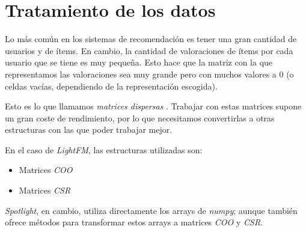 \section{Tratamiento de los datos}\label{tratamiento-datos}
Lo más común en los sistemas de recomendación es tener una gran cantidad de usuarios y de ítems. En cambio, la cantidad de valoraciones de ítems por cada usuario que se tiene es muy pequeña. Esto hace que la matriz con la que representamos las valoraciones sea muy grande pero con muchos valores a 0 (o celdas vacías, dependiendo de la representación escogida).  

Esto es lo que llamamos \textit{matrices dispersas} \cite{wiki:Sparse_matrix}. Trabajar con estas matrices supone un gran coste de rendimiento, por lo que necesitamos convertirlas a otras estructuras con las que poder trabajar mejor.

En el caso de \textit{LightFM}, las estructuras utilizadas son:
\begin{itemize}
\tightlist
\item Matrices \textit{COO}
\item Matrices \textit{CSR}  
\end{itemize}

\textit{Spotlight}, en cambio, utiliza directamente los arrays de \textit{numpy}; aunque también ofrece métodos para transformar estos arrays a matrices \textit{COO} y \textit{CSR}.

